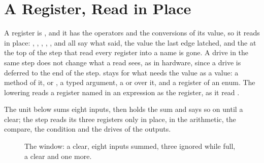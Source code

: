 \section{A Register, Read in Place}
\label{sec:x-inplace}

A register is , and it has the operators and the
conversions of its value, so it reads in place: ,
, , ,
,  and
 all say what  said, the
value the last edge latched, and the  at the top of the
step that read every register into a name is gone. A drive in the
same step does not change what a read sees, as in hardware, since a
drive is deferred to the end of the step.  stays for what
needs the value as a value: a method of it, 
or , a typed argument, a  or 
over it, and a register of an enum. The lowering reads a register
named in an expression as the register, as it read .

The unit below sums eight inputs, then holds the sum and says so on
 until a clear; the step reads its three registers only in
place, in the arithmetic, the compare, the condition and the drives
of the outputs.

\begin{figure}[htbp]
\centering

\caption{The window: a clear, eight inputs summed, three ignored while full, a clear and one more.}
\label{fig:x-inplace}
\end{figure}





